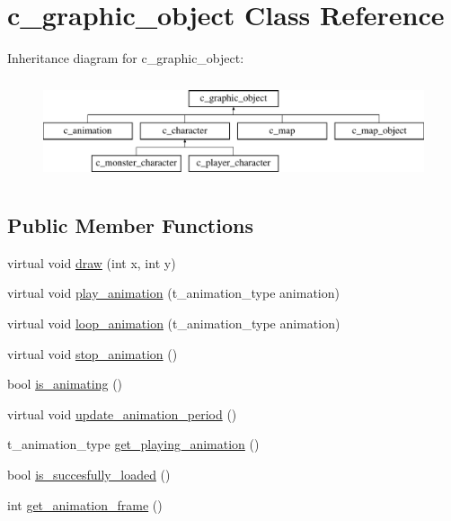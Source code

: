 \hypertarget{classc__graphic__object}{\section{c\-\_\-graphic\-\_\-object Class Reference}
\label{classc__graphic__object}
}
Inheritance diagram for c\-\_\-graphic\-\_\-object\-:\begin{figure}[H]
\begin{center}
\leavevmode
\includegraphics[height=3.000000cm]{classc__graphic__object}
\end{center}
\end{figure}
\subsection*{Public Member Functions}
\begin{DoxyCompactItemize}
\item 
virtual void \hyperlink{classc__graphic__object_a94ef8137eed9ce1ae7adf366fefb51cf}{draw} (int x, int y)
\item 
virtual void \hyperlink{classc__graphic__object_aa87323c0df1b2e79cef78573b6096512}{play\-\_\-animation} (t\-\_\-animation\-\_\-type animation)
\item 
virtual void \hyperlink{classc__graphic__object_ac60b00df5a7edefe4c61e6a59802473f}{loop\-\_\-animation} (t\-\_\-animation\-\_\-type animation)
\item 
virtual void \hyperlink{classc__graphic__object_a32cdba2150d09d903f6e95f2509b9283}{stop\-\_\-animation} ()
\item 
bool \hyperlink{classc__graphic__object_af5f3b289e5f0f4501ee5b5a36fb4aad8}{is\-\_\-animating} ()
\item 
virtual void \hyperlink{classc__graphic__object_a20fa3f61532b73f64f3307fd14b7dba6}{update\-\_\-animation\-\_\-period} ()
\item 
t\-\_\-animation\-\_\-type \hyperlink{classc__graphic__object_a3028097b164e7d88fbde871af2bcc679}{get\-\_\-playing\-\_\-animation} ()
\item 
bool \hyperlink{classc__graphic__object_aef3311c6cff7e455867882eba8b34e84}{is\-\_\-succesfully\-\_\-loaded} ()
\item 
int \hyperlink{classc__graphic__object_a8e692d099d44b9d367d197bc2a582d16}{get\-\_\-animation\-\_\-frame} ()
\end{DoxyCompactItemize}
